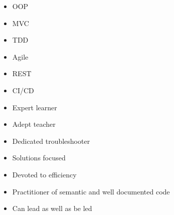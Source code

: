 \documentclass[letterpaper]{article}        %
\begin{document}
\begin{multicols}{3}
      \begin{itemize}
            \end{itemize}
    
      \begin{itemize}
        \item OOP
        \item MVC
        \item TDD
        \item Agile
        \item REST
        \item CI/CD
        \end{itemize}
    
      \begin{itemize}
            \end{itemize}
    
      \begin{itemize}
        \item Expert learner
        \item Adept teacher
        \item Dedicated troubleshooter
        \item Solutions focused
        \item Devoted to efficiency
        \item Practitioner of semantic and well documented code
        \item Can lead as well as be led
        \end{itemize}
    
    
  \end{multicols}
\end{document}
